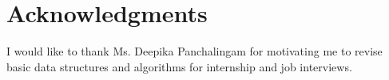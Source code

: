 \documentclass[letterpaper,12pt]{report}
\begin{document}
%


\chapter*{Acknowledgments}
\label{chp:Acknowledgments}

I would like to thank Ms. Deepika Panchalingam for motivating me to revise basic data structures and algorithms for internship and job interviews.




%
%
%
\appendix

{\linespread{1}

%
%

%
}
\end{document}
